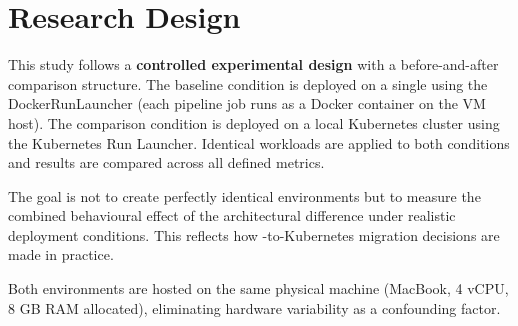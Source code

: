 \section{Research Design}

This study follows a \textbf{controlled experimental design} with a before-and-after
comparison structure. The baseline condition is \dagster{} deployed on a single \vm{}
using the DockerRunLauncher (each pipeline job runs as a Docker container on the VM host).
The comparison condition is \dagster{} deployed on a local Kubernetes cluster using the
Kubernetes Run Launcher. Identical workloads are applied to both conditions and results are
compared across all defined metrics.

The goal is not to create perfectly identical environments but to measure the combined
behavioural effect of the architectural difference under realistic deployment conditions.
This reflects how \vm{}-to-Kubernetes migration decisions are made in practice.

Both environments are hosted on the same physical machine (MacBook, 4 vCPU, 8 GB RAM
allocated), eliminating hardware variability as a confounding factor.
